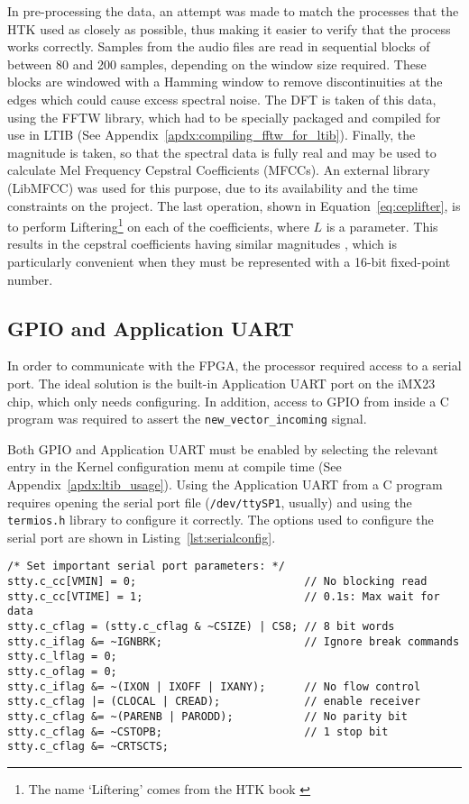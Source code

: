 		In pre-processing the data, an attempt was made to match the processes that the HTK used as closely as possible, thus making it easier to verify that the process works correctly.  Samples from the audio files are read in sequential blocks of between 80 and 200 samples, depending on the window size required.  These blocks are windowed with a Hamming window to remove discontinuities at the edges which could cause excess spectral noise.  The DFT is taken of this data, using the FFTW library, which had to be specially packaged and compiled for use in LTIB (See Appendix~\ref{apdx:compiling_fftw_for_ltib}).  Finally, the magnitude is taken, so that the spectral data is fully real and may be used to calculate Mel Frequency Cepstral Coefficients (MFCCs).  An external library (LibMFCC) was used for this purpose, due to its availability and the time constraints on the project.  The last operation, shown in Equation~\ref{eq:ceplifter}, is to perform Liftering\footnote{The name `Liftering' comes from the HTK book \cite{htkbook}} on each of the coefficients, where $L$ is a parameter.  This results in the cepstral coefficients having similar magnitudes \cite{htkbook}, which is particularly convenient when they must be represented with a 16-bit fixed-point number.

	\subsection{GPIO and Application UART} %
	\label{sub:gpio_application_uart}
		In order to communicate with the FPGA, the processor required access to a serial port.  The ideal solution is the built-in Application UART port on the iMX23 chip, which only needs configuring.  In addition, access to GPIO from inside a C program was required to assert the \texttt{new\_vector\_incoming} signal.

		Both GPIO and Application UART must be enabled by selecting the relevant entry in the Kernel configuration menu at compile time (See Appendix~\ref{apdx:ltib_usage}).  Using the Application UART from a C program requires opening the serial port file (\texttt{/dev/ttySP1}, usually) and using the \texttt{termios.h} library to configure it correctly.  The options used to configure the serial port are shown in Listing~\ref{lst:serialconfig}.

\begin{lstlisting}[style=customc, label=lst:serialconfig, caption=Serial Port Configuration]
/* Set important serial port parameters: */
stty.c_cc[VMIN] = 0;                          // No blocking read
stty.c_cc[VTIME] = 1;                         // 0.1s: Max wait for data
stty.c_cflag = (stty.c_cflag & ~CSIZE) | CS8; // 8 bit words
stty.c_iflag &= ~IGNBRK;                      // Ignore break commands
stty.c_lflag = 0;
stty.c_oflag = 0;
stty.c_iflag &= ~(IXON | IXOFF | IXANY);      // No flow control
stty.c_cflag |= (CLOCAL | CREAD);             // enable receiver
stty.c_cflag &= ~(PARENB | PARODD);           // No parity bit
stty.c_cflag &= ~CSTOPB;                      // 1 stop bit
stty.c_cflag &= ~CRTSCTS;
\end{lstlisting}

